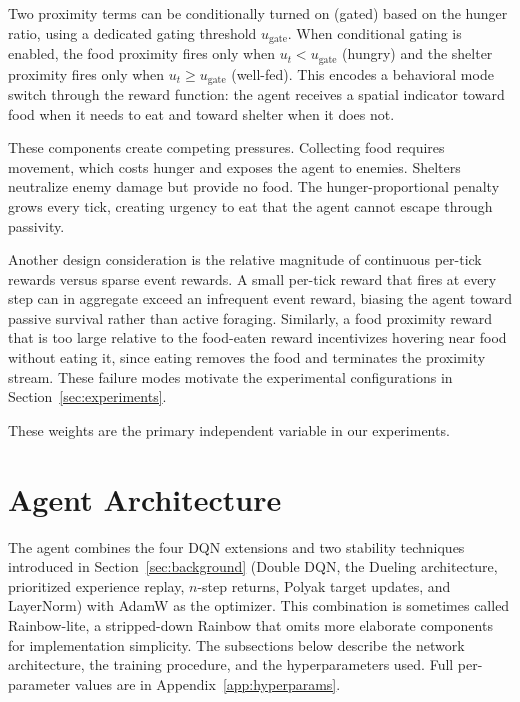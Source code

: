 \documentclass[12pt,a4paper,titlepage]{article}
\begin{document}
Two proximity terms can be conditionally turned on (gated) based on the hunger ratio, using a dedicated gating threshold $u_\text{gate}$. When conditional gating is enabled, the food proximity fires only when $u_t < u_\text{gate}$ (hungry) and the shelter proximity fires only when $u_t \geq u_\text{gate}$ (well-fed). This encodes a behavioral mode switch through the reward function: the agent receives a spatial indicator toward food when it needs to eat and toward shelter when it does not.

These components create competing pressures. Collecting food requires movement, which costs hunger and exposes the agent to enemies. Shelters neutralize enemy damage but provide no food. The hunger-proportional penalty grows every tick, creating urgency to eat that the agent cannot escape through passivity.

Another design consideration is the relative magnitude of continuous per-tick rewards versus sparse event rewards. A small per-tick reward that fires at every step can in aggregate exceed an infrequent event reward, biasing the agent toward passive survival rather than active foraging. Similarly, a food proximity reward that is too large relative to the food-eaten reward incentivizes hovering near food without eating it, since eating removes the food and terminates the proximity stream. These failure modes motivate the experimental configurations in Section~\ref{sec:experiments}.

These weights are the primary independent variable in our experiments.

\section{Agent Architecture}
\label{sec:architecture}

The agent combines the four DQN extensions and two stability techniques introduced in Section~\ref{sec:background} (Double DQN, the Dueling architecture, prioritized experience replay, $n$-step returns, Polyak target updates, and LayerNorm) with AdamW \citep{Loshchilov2019} as the optimizer. This combination is sometimes called Rainbow-lite, a stripped-down Rainbow that omits more elaborate components for implementation simplicity. The subsections below describe the network architecture, the training procedure, and the hyperparameters used. Full per-parameter values are in Appendix~\ref{app:hyperparams}.
\end{document}
